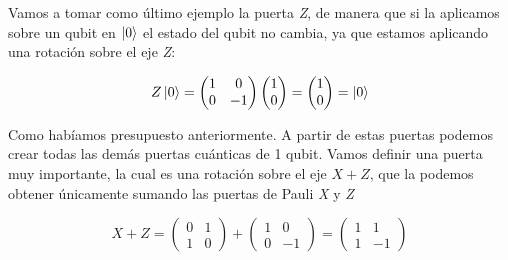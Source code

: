 \documentclass[12pt]{article}
\numberwithin{equation}{section} %
\begin{document}
    \begin{minipage}{0.1\textwidth}
        \hfill
    \end{minipage}

    \vspace{5mm}

    Vamos a tomar como último ejemplo la puerta \textit{Z}, de manera que si la aplicamos sobre un qubit en \( \ket{0} \)
    el estado del qubit no cambia, ya que estamos aplicando una rotación sobre el eje \textit{Z}:

    \begin{equation*}
        Z \ket{0} = \begin{pmatrix}
            1 & 0 \\
            0 & -1
        \end{pmatrix} \begin{pmatrix}
            1 \\
            0
        \end{pmatrix} = \begin{pmatrix}
            1 \\
            0
        \end{pmatrix} = \ket{0}
    \end{equation*}

    \vspace{2.5mm}

    Como habíamos presupuesto anteriormente. A partir de estas puertas podemos crear todas las demás puertas cuánticas de 1 qubit. Vamos definir una puerta muy importante, la cual es una rotación sobre el eje \( X + Z \), que la podemos obtener únicamente sumando las puertas de Pauli \textit{X} y \textit{Z}

    \begin{equation*}
        X + Z = \begin{pmatrix}
            0 & 1 \\
            1 & 0 
        \end{pmatrix} + \begin{pmatrix}
            1 & 0 \\
            0 & -1
        \end{pmatrix} = \begin{pmatrix}
            1 & 1 \\
            1 & -1
        \end{pmatrix}
    \end{equation*}

    \vspace{2.5mm}
\end{document}
